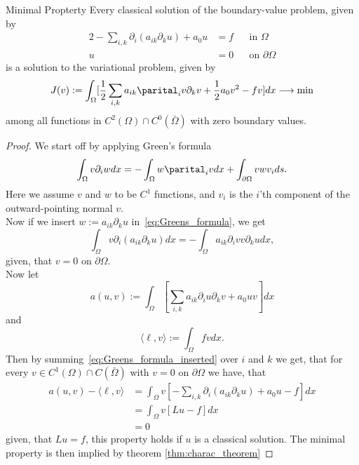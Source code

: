 \begin{thmx}{Minimal Propterty}
    Every classical solution of the boundary-value problem, given by
    \begin{alignat}{2}
        -\sum_{i,k} \partial_i (a_{ik}\partial_k u) + a_0 u &= f && \text{in } \Omega \\
        u &= 0 && \text{on } \partial \Omega
    \end{alignat}
    is a solution to the variational problem, given by
    \[
        J(v):=\int_\Omega [\frac{1}{2}\sum_{i,k} a_{ik} \parital_i v\partial_k v + \frac{1}{2} a_0 v^2 -fv]dx \longrightarrow \min
    \]
    among all functions in $C^2(\Omega)\cap C^0(\bar{\Omega})$ with zero boundary values. 
\end{thmx}

\begin{proof}
    We start off by applying Green's formula
    \[
    \label{eq:Greens_formula}
        \int_\Omega v\partial_i w dx = -\int_\Omega w\parital_i v dx + \int_{\partial \Omega} v w v_i ds.
    \]
    Here we assume $v$ and $w$ to be $C^1$ functions, and $v_i$ is the $i$'th component of the outward-pointing normal $v$.
    \\
    Now if we insert $w:=a_{ik}\partial_k u$ in~\eqref{eq:Greens_formula}, we get
    \[
    \label{eq:Greens_formula_inserted}
        \int_\Omega v\partial_i (a_{ik} \partial_k u) dx = -\int_\Omega a_{ik} \partial_i v v\partial_k u dx,
    \]  
    given, that $v=0$ on $\partial \Omega$.
    \\
    Now let 
    \begin{equation}
    \label{eq:a(u,v)}
        a(u,v) := \int_\Omega \left[\sum_{i,k} a_{ik} \partial_i u \partial_k v +a_0 uv \right]dx
    \end{equation}
    and
    \begin{equation}
    \label{eq:l(v)}
        \langle \ell,v \rangle := \int_\Omega fv dx.
    \end{equation}
    Then by summing~\eqref{eq:Greens_formula_inserted} over $i$ and $k$ we get, that for every $v\in C^1(\Omega) \cap C(\bar{\Omega})$ with $v=0$ on $\partial \Omega$ we have, that 
    \begin{align*}
        a(u,v) - \langle \ell,v \rangle &= \int_\Omega v\left[ -\sum_{i,k} \partial_i (a_{ik} \partial_k u) + a_0 u - f \right] dx \\     
        &= \int_\Omega v [Lu - f] dx \\
        &= 0
    \end{align*}
    given, that $Lu = f$, this property holds if $u$ is a classical solution. The minimal property is then implied by theorem \ref{thm:charac_theorem}
\end{proof}